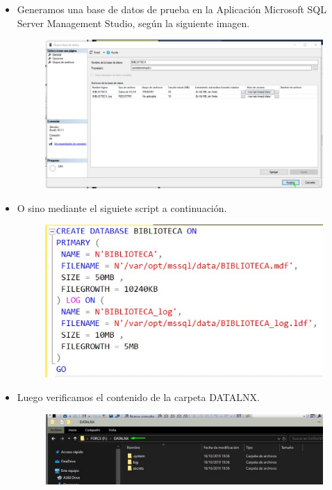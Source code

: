 \begin{itemize}
\begin{figure}[htb]
\begin{center}
							\end{center}
						\end{figure}
					\item Generamos una base de datos de prueba en la Aplicación Microsoft SQL Server Management Studio, según la siguiente imagen.
						\begin{figure}[htb]
							\begin{center}
								\includegraphics[width=18cm]{./Imagenes/GenerarDataBase}
							\end{center}
						\end{figure}
						\vspace{4cm}
					\item O sino mediante el siguiete script a continuación.
						\begin{figure}[htb]
							\begin{center}
								\includegraphics[width=16cm]{./Imagenes/CrearDataBase}
							\end{center}
						\end{figure}
						\vspace{12cm}
					\item Luego verificamos el contenido de la carpeta DATALNX.
						\begin{figure}[htb]
							\begin{center}
								\includegraphics[width=16cm]{./Imagenes/VerificarDATALNX}
							\end{center}
						\end{figure}

\end{itemize}
